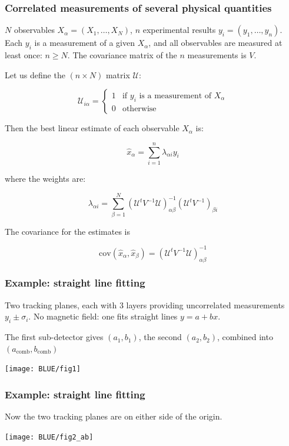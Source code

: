 \documentclass[9pt]{beamer}
\newif\ifmyhide
\newcommand\myhide[1]{%
\ifmyhide \vspace{15pt} \begin{center} \myexample{(blackboard)}\end{center} \vspace{15pt} \else #1 \fi
}
\begin{document}
\begin{frame}
 \frametitle{Correlated measurements of several physical quantities}
 
 $N$ observables $X_\alpha = (X_1,\dots,X_N)$, $n$ experimental results $y_i = (y_1,\dots,y_n)$. Each $y_i$ is a measurement of a given $X_\alpha$, and all observables are measured at least
 once: $n \geq N$. The covariance matrix of the $n$ measurements is $V$.
 
 Let us define the $(n \times N)$ matrix $\mathcal{U}$: 
 
 \myhide{
 $$\mathcal{U}_{i\alpha} = \begin{cases} 
      1 & \text{if } y_i \text{ is a measurement of } X_\alpha  \\ 
      0 & \text{otherwise}
   \end{cases}$$
   
   Then the best linear estimate of each observable $X_\alpha$ is:
   
   $$\hat{x}_\alpha = \sum_{i=1}^n \lambda_{\alpha i} y_i$$
   
   where the weights are:
   
   $$\lambda_{\alpha i} = \sum_{\beta=1}^N \left( \mathcal{U}^t V^{-1} \mathcal{U} \right)^{-1}_{\alpha \beta} \left(\mathcal{U}^t V^{-1} \right)_{\beta i} $$
   
   The covariance for the estimates is
   
   $$\text{cov}(\hat{x}_\alpha, \hat{x}_\beta) =\left( \mathcal{U}^t V^{-1} \mathcal{U} \right)^{-1}_{\alpha \beta} $$
   }
\end{frame}

\begin{frame}
 \frametitle{Example: straight line fitting}
 
 Two tracking planes, each with 3 layers providing uncorrelated measurements $y_i \pm \sigma_i$. No magnetic field: one fits straight lines $y = a + bx$.
 
 The first sub-detector gives $(a_1,b_1)$, the second $(a_2,b_2)$, combined into $(a_\text{comb},b_\text{comb})$
 
 \texttt{[image: BLUE/fig1]}
\end{frame}

\begin{frame}
 \frametitle{Example: straight line fitting}
 
 Now the two tracking planes are on either side of the origin.
 
 \texttt{[image: BLUE/fig2\_ab]}
\end{frame}
\end{document}
